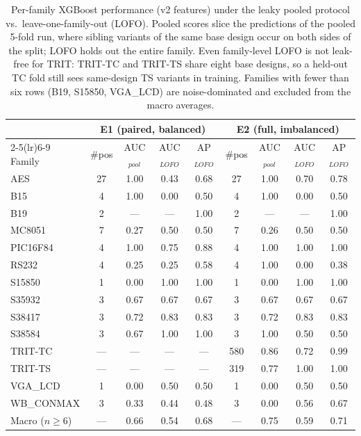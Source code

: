 \begin{table}[t]
\centering
\caption{Per-family XGBoost performance (v2 features) under the leaky pooled protocol vs.\ leave-one-family-out (LOFO). Pooled scores slice the predictions of the pooled 5-fold run, where sibling variants of the same base design occur on both sides of the split; LOFO holds out the entire family. Even family-level LOFO is not leak-free for TRIT: TRIT-TC and TRIT-TS share eight base designs, so a held-out TC fold still sees same-design TS variants in training. Families with fewer than six rows (B19, S15850, VGA\_LCD) are noise-dominated and excluded from the macro averages.}
\label{tab:family}
\small
\begin{tabular}{lcccccccc}
\toprule
& \multicolumn{4}{c}{E1 (paired, balanced)} & \multicolumn{4}{c}{E2 (full, imbalanced)} \\
\cmidrule(lr){2-5}\cmidrule(lr){6-9}
Family & \#pos & AUC$_{pool}$ & AUC$_{LOFO}$ & AP$_{LOFO}$ & \#pos & AUC$_{pool}$ & AUC$_{LOFO}$ & AP$_{LOFO}$ \\
\midrule
AES & 27 & 1.00 & 0.43 & 0.68 & 27 & 1.00 & 0.70 & 0.78 \\
B15 & 4 & 1.00 & 0.00 & 0.50 & 4 & 1.00 & 0.00 & 0.50 \\
B19 & 2 & --- & --- & 1.00 & 2 & --- & --- & 1.00 \\
MC8051 & 7 & 0.27 & 0.50 & 0.50 & 7 & 0.26 & 0.50 & 0.50 \\
PIC16F84 & 4 & 1.00 & 0.75 & 0.88 & 4 & 1.00 & 1.00 & 1.00 \\
RS232 & 4 & 0.25 & 0.25 & 0.58 & 4 & 1.00 & 0.00 & 0.38 \\
S15850 & 1 & 0.00 & 1.00 & 1.00 & 1 & 0.00 & 1.00 & 1.00 \\
S35932 & 3 & 0.67 & 0.67 & 0.67 & 3 & 0.67 & 0.67 & 0.67 \\
S38417 & 3 & 0.72 & 0.83 & 0.83 & 3 & 0.72 & 0.83 & 0.83 \\
S38584 & 3 & 0.67 & 1.00 & 1.00 & 3 & 1.00 & 0.50 & 0.50 \\
TRIT-TC & --- & --- & --- & --- & 580 & 0.86 & 0.72 & 0.99 \\
TRIT-TS & --- & --- & --- & --- & 319 & 0.77 & 1.00 & 1.00 \\
VGA\_LCD & 1 & 0.00 & 0.50 & 0.50 & 1 & 0.00 & 0.50 & 0.50 \\
WB\_CONMAX & 3 & 0.33 & 0.44 & 0.48 & 3 & 0.00 & 0.56 & 0.67 \\
\midrule
Macro ($n\geq 6$) & --- & 0.66 & 0.54 & 0.68 & --- & 0.75 & 0.59 & 0.71 \\
\bottomrule
\end{tabular}
\end{table}
